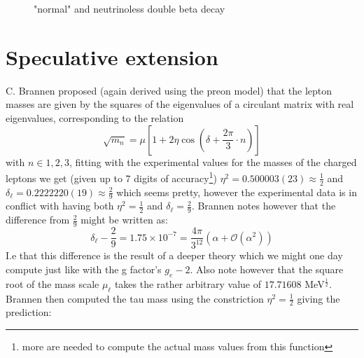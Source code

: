 \documentclass[twoside,twocolumn,11pt]{article} %
\begin{document}
\begin{figure}
\begin{minipage}{0.5\textwidth}
\begin{minipage}{0.49\textwidth}
		\end{minipage}
	\end{minipage}
	\caption{"normal" and neutrinoless double beta decay}
	\label{fig:normal and neutrinoless double beta decay}
\end{figure}
\section{Speculative extension}
C. Brannen proposed \cite{Brannen2006TheLM} (again derived using the preon model) that the lepton masses are given by the squares of the eigenvalues of a circulant matrix with real eigenvalues, corresponding to the relation
\begin{equation}
	\sqrt{m_{n}}=\mu\left[1+2 \eta \cos \left(\delta+\frac{2 \pi}{3} \cdot n\right)\right] \label{eq:circulantmatrix}
\end{equation}
with $n\in{1,2,3}$, fitting with the experimental values for the masses of the charged leptons we get (given up to 7 digits of accuracy\footnote{more are needed to compute the actual mass values from this function}) $\eta^2 = 0.500003(23) \approx \frac{1}{2}$ and $\delta_\ell = 0.2222220(19) \approx \frac{2}{9}$ which seems pretty, however the experimental data is in conflict with having both $\eta^2 = \frac{1}{2}$ and $\delta_\ell = \frac{2}{9}$. Brannen notes however that the difference from $\frac{2}{9}$ might be written as:
\begin{equation}
	\delta_\ell - \frac{2}{9} = 1.75 \times 10^{-7}=\frac{4 \pi}{3^{12}}\left(\alpha+\mathcal{O}\left(\alpha^{2}\right)\right)
\end{equation}
I.e that this difference is the result of a deeper theory which we might one day compute just like with the g factor's $g_e-2$. Also note however that the square root of the mass scale $\mu_\ell$ takes the rather arbitrary value of $17.71608$ MeV$^{\frac{1}{2}}$. 
Brannen then computed the tau mass using the constriction $\eta^2=\frac{1}{2}$ giving the prediction:
\end{document}
